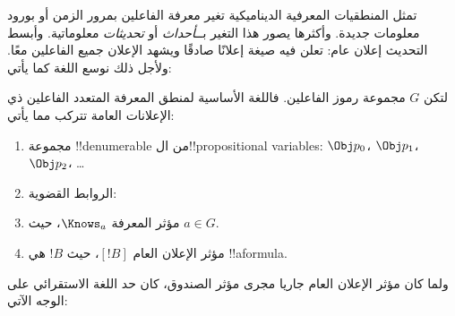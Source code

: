 \documentclass[../../../include/open-logic-section]{subfiles}
\begin{document}


تمثل المنطقيات المعرفية الديناميكية تغير معرفة الفاعلين بمرور الزمن أو
بورود معلومات جديدة. وأكثرها يصور هذا التغير بــ\emph{أحداث} أو
\emph{تحديثات} معلوماتية. وأبسط التحديث إعلان عام: تعلن فيه صيغة إعلانًا
صادقًا ويشهد الإعلان جميع الفاعلين معًا. ولأجل ذلك نوسع اللغة كما يأتي:

\begin{defn}
لتكن $G$ مجموعة رموز الفاعلين. فاللغة الأساسية لمنطق المعرفة المتعدد
الفاعلين ذي الإعلانات العامة تتركب مما يأتي:
\begin{enumerate}
  \item مجموعة !!{denumerable} من ال!!{propositional variable}s:
    $\Obj p_0$، $\Obj p_1$، $\Obj p_2$، \dots
  \item الروابط القضوية: \startycommalist
  \item مؤثر المعرفة $\Knows_a$، حيث $a \in G$.
  \item مؤثر الإعلان العام $[!B]$، حيث $!B$ هي !!a{formula}.
\end{enumerate}
\end{defn}

ولما كان مؤثر الإعلان العام جاريا مجرى مؤثر الصندوق، كان حد اللغة
الاستقرائي على الوجه الآتي:
\end{document}
